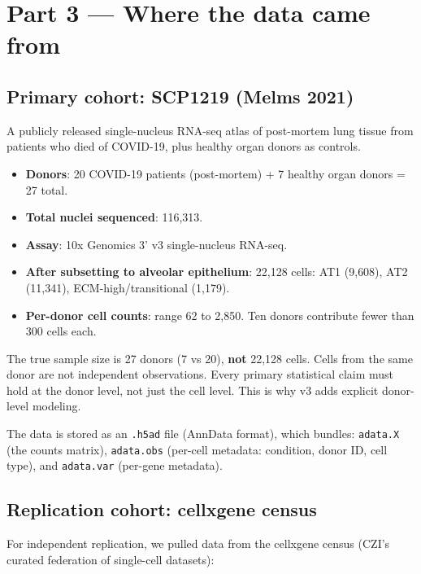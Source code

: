 \documentclass[11pt]{article}
\begin{document}
\section{Part 3 --- Where the data came from}

\subsection{Primary cohort: SCP1219 (Melms 2021)}

A publicly released single-nucleus RNA-seq atlas of post-mortem lung tissue from patients who died of COVID-19, plus healthy organ donors as controls.

\begin{itemize}
\item \textbf{Donors}: 20 COVID-19 patients (post-mortem) + 7 healthy organ donors = 27 total.
\item \textbf{Total nuclei sequenced}: 116{,}313.
\item \textbf{Assay}: 10x Genomics 3' v3 single-nucleus RNA-seq.
\item \textbf{After subsetting to alveolar epithelium}: 22{,}128 cells: AT1 (9{,}608), AT2 (11{,}341), ECM-high/transitional (1{,}179).
\item \textbf{Per-donor cell counts}: range 62 to 2{,}850. Ten donors contribute fewer than 300 cells each.
\end{itemize}

\begin{pitfall}
The true sample size is 27 donors (7 vs 20), \textbf{not} 22{,}128 cells. Cells from the same donor are not independent observations. Every primary statistical claim must hold at the donor level, not just the cell level. This is why v3 adds explicit donor-level modeling.
\end{pitfall}

The data is stored as an \texttt{.h5ad} file (AnnData format), which bundles: \texttt{adata.X} (the counts matrix), \texttt{adata.obs} (per-cell metadata: condition, donor ID, cell type), and \texttt{adata.var} (per-gene metadata).

\subsection{Replication cohort: cellxgene census}

For independent replication, we pulled data from the cellxgene census (CZI's curated federation of single-cell datasets):
\end{document}
